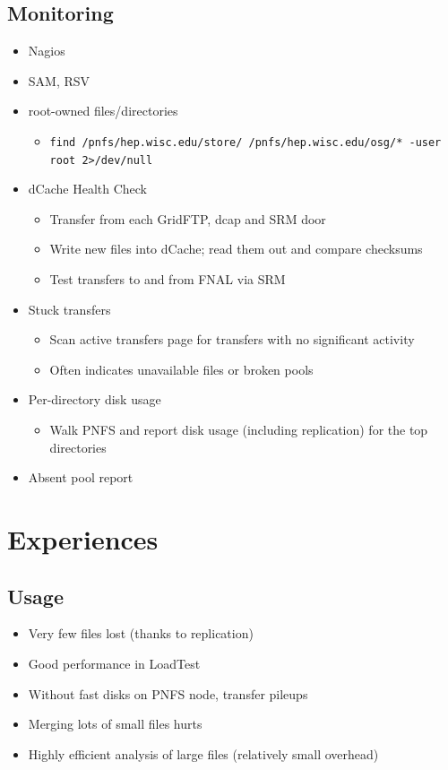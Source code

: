 \documentclass{beamer}
\begin{document}
\subsection{Monitoring}
\begin{frame}
\begin{itemize}
	\item Nagios
	\item SAM, RSV
	\item root-owned files/directories
	\begin{itemize}
		\item {\tt find /pnfs/hep.wisc.edu/store/ /pnfs/hep.wisc.edu/osg/* -user root 2>/dev/null}
	\end{itemize}
	\item dCache Health Check
	\begin{itemize}
		\item Transfer from each GridFTP, dcap and SRM door
		\item Write new files into dCache; read them out and compare checksums
		\item Test transfers to and from FNAL via SRM
	\end{itemize}
	\item Stuck transfers
	\begin{itemize}
		\item Scan active transfers page for transfers with no significant activity
		\item Often indicates unavailable files or broken pools
	\end{itemize}
	\item Per-directory disk usage
	\begin{itemize}
		\item Walk PNFS and report disk usage (including replication) for the top directories
	\end{itemize}
	\item Absent pool report
\end{itemize}
\end{frame}

\section{Experiences}
\subsection{Usage}
\begin{frame}
\begin{itemize}
	\item Very few files lost (thanks to replication)
	\item Good performance in LoadTest
	\item Without fast disks on PNFS node, transfer pileups
	\item Merging lots of small files hurts
	\item Highly efficient analysis of large files (relatively small overhead)
\end{itemize}
\end{frame}
\end{document}
